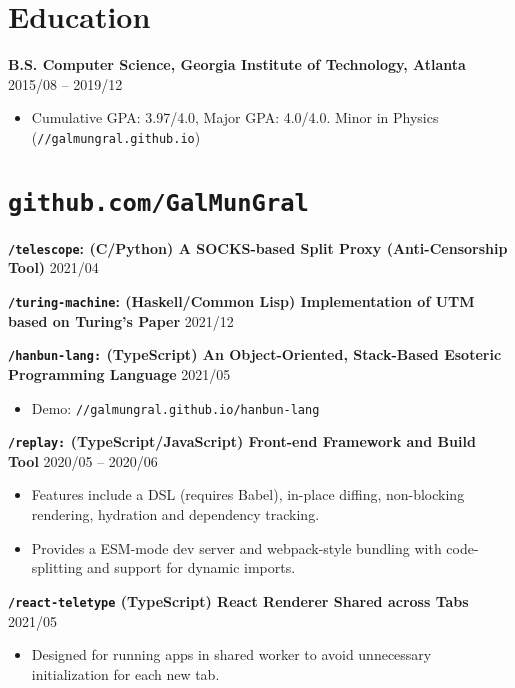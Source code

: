 \documentclass[10pt]{article}
\begin{document}
\section*{Education}
\textbf{B.S. Computer Science, Georgia Institute of Technology, Atlanta} \hfill 2015/08 -- 2019/12
\begin{itemize}
\item  Cumulative GPA: 3.97/4.0, Major GPA: 4.0/4.0. Minor in Physics (\texttt{//galmungral.github.io})
\end{itemize} 

\section*{\texttt{\large github.com/GalMunGral}}

\textbf{\texttt{/telescope}:  (C/Python) A SOCKS-based Split Proxy (Anti-Censorship Tool)}   \hfill 2021/04

\vspace{0.5em}
\textbf{\texttt{/turing-machine}:  (Haskell/Common Lisp) Implementation of UTM based on Turing's Paper} \hfill 2021/12

\vspace{0.5em}
\textbf{\texttt{/hanbun-lang:} (TypeScript) An Object-Oriented, Stack-Based Esoteric Programming Language} \hfill 2021/05
\begin{itemize}
\item Demo: \texttt{//galmungral.github.io/hanbun-lang}
\end{itemize}

\vspace{0.5em}
\textbf{\texttt{/replay:} (TypeScript/JavaScript) Front-end Framework and Build Tool} \hfill 2020/05 -- 2020/06
\begin{itemize}
\item Features include a DSL (requires Babel), in-place diffing, non-blocking rendering, hydration and dependency tracking.
\item Provides a ESM-mode dev server and webpack-style bundling with code-splitting and support for dynamic imports.
\end{itemize}

\vspace{0.5em}
\textbf{\texttt{/react-teletype}  (TypeScript) React Renderer Shared across Tabs} \hfill 2021/05 
\begin{itemize}
\item Designed for running apps in shared worker to avoid unnecessary initialization for each new tab.
\end{itemize}
\end{document}
